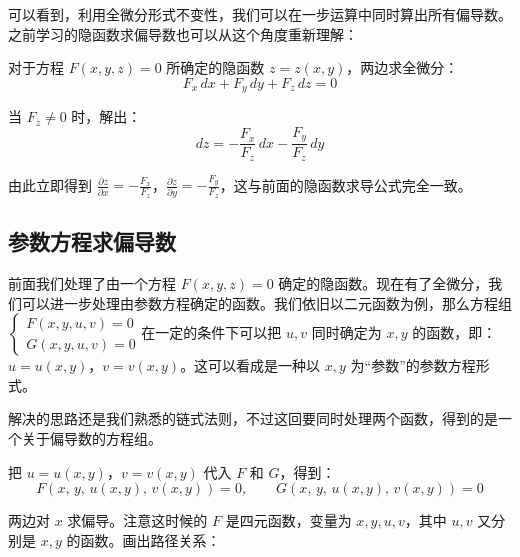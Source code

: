 可以看到，利用全微分形式不变性，我们可以在一步运算中同时算出所有偏导数。之前学习的隐函数求偏导数也可以从这个角度重新理解：

对于方程 $F(x, y, z) = 0$ 所确定的隐函数 $z = z(x, y)$，两边求全微分：
\[
F_x\,dx + F_y\,dy + F_z\,dz = 0
\]

当 $F_z \neq 0$ 时，解出：
\[
dz = -\frac{F_x}{F_z}\,dx - \frac{F_y}{F_z}\,dy
\]

由此立即得到 $\frac{\partial z}{\partial x} = -\frac{F_x}{F_z}$，$\frac{\partial z}{\partial y} = -\frac{F_y}{F_z}$，这与前面的隐函数求导公式完全一致。

\subsection{参数方程求偏导数}

前面我们处理了由一个方程 $F(x,y,z)=0$ 确定的隐函数。现在有了全微分，我们可以进一步处理由参数方程确定的函数。我们依旧以二元函数为例，那么方程组$\begin{cases}
F(x,y,u,v)=0 \\
G(x,y,u,v)=0
\end{cases}$在一定的条件下可以把 $u,v$ 同时确定为 $x,y$ 的函数，即：$u=u(x,y)$，$v=v(x,y)$。这可以看成是一种以 $x,y$ 为“参数”的参数方程形式。

解决的思路还是我们熟悉的链式法则，不过这回要同时处理两个函数，得到的是一个关于偏导数的方程组。

把 $u=u(x,y)$，$v=v(x,y)$ 代入 $F$ 和 $G$，得到：
\[
F(x,\,y,\,u(x,y),\,v(x,y))=0,\qquad
G(x,\,y,\,u(x,y),\,v(x,y))=0
\]

两边对 $x$ 求偏导。注意这时候的 $F$ 是四元函数，变量为 $x,y,u,v$，其中 $u,v$ 又分别是 $x,y$ 的函数。画出路径关系：

\begin{center}
\end{center}

